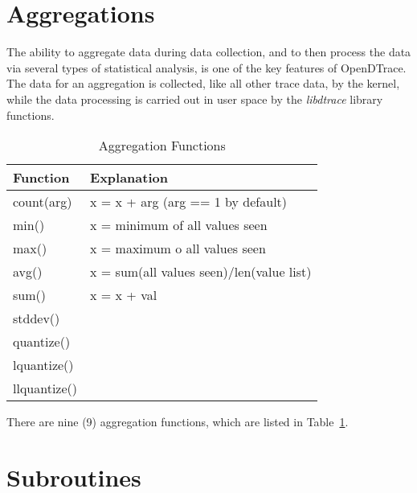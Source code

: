 \section{Aggregations}
\label{sec:aggregations}

The ability to aggregate data during data collection, and to then
process the data via several types of statistical analysis, is one of
the key features of OpenDTrace.  The data for an aggregation is
collected, like all other trace data, by the kernel, while the data
processing is carried out in user space by the \emph{libdtrace}
library functions.

\begin{table}
  \centering
  \begin{tabular}{l|l}
    Function & Explanation\\
    \hline
    count(arg) & x = x + arg (arg == 1 by default)\\
    min() & x = minimum of all values seen\\
    max() & x = maximum o all values seen\\
    avg() & x = sum(all values seen)/len(value list)\\
    sum() & x = x + val\\
    stddev() & \\
    quantize() & \\
    lquantize() & \\
    llquantize() &
  \end{tabular}
  \caption{Aggregation Functions}
  \label{tab:agg-func}
\end{table}

There are nine (9) aggregation functions, which are listed in
Table~\ref{tab:agg-func}.

\section{Subroutines}
\label{sec:subroutines}

